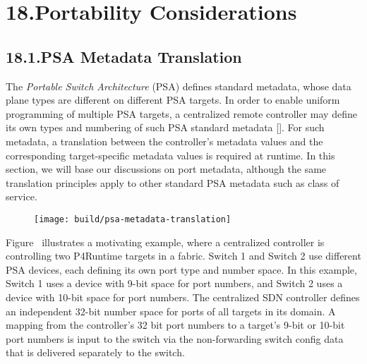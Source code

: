 \documentclass[11pt]{article}
\begin{document}
{%
\section{18.\hspace*{0.5em}Portability Considerations}\label{sec-portability-considerations}%

\subsection{18.1.\hspace*{0.5em}PSA Metadata Translation}\label{sec-psa-metadata-translation}%

\noindent{}The \emph{Portable Switch Architecture} (PSA) defines standard metadata, whose
data plane types are different on different PSA targets. In order to enable
uniform programming of multiple PSA targets, a centralized remote controller may
define its own types and numbering of such PSA standard metadata
[]. For such metadata, a translation between the controller's
metadata values and the corresponding target-specific metadata values is
required at runtime. In this section, we will base our discussions on port
metadata, although the same translation principles apply to other standard PSA
metadata such as class of service.%

\begin{figure}[tbp]%
\begin{mdcenter}%

\noindent{}\texttt{[image: build/psa-metadata-translation]}{}%

\mdhr{}%

\noindent{}%
\end{mdcenter}\label{fig-psa-metadata-translation}%
\end{figure}%

\noindent{}Figure~ illustrates a motivating example,
where a centralized controller is controlling two P4Runtime targets in a fabric.
Switch 1 and Switch 2 use different PSA devices, each defining its own port type
and number space. In this example, Switch 1 uses a device with 9-bit space for
port numbers, and Switch 2 uses a device with 10-bit space for port numbers. The
centralized SDN controller defines an independent 32-bit number space for ports
of all targets in its domain. A mapping from the controller's 32 bit port
numbers to a target's 9-bit or 10-bit port numbers is input to the switch via
the non-forwarding switch config data that is delivered separately to the
switch.%

}
\end{document}
